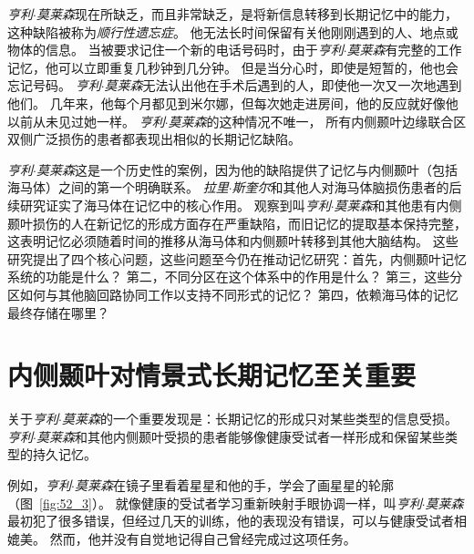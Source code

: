 \textit{亨利$\cdot$莫莱森}现在所缺乏，而且非常缺乏，是将新信息转移到长期记忆中的能力，这种缺陷被称为\textit{顺行性遗忘症}。
他无法长时间保留有关他刚刚遇到的人、地点或物体的信息。
当被要求记住一个新的电话号码时，由于\textit{亨利$\cdot$莫莱森}有完整的工作记忆，他可以立即重复几秒钟到几分钟。
但是当分心时，即使是短暂的，他也会忘记号码。
\textit{亨利$\cdot$莫莱森}无法认出他在手术后遇到的人，即使他一次又一次地遇到他们。
几年来，他每个月都见到米尔娜，但每次她走进房间，他的反应就好像他以前从未见过她一样。
\textit{亨利$\cdot$莫莱森}的这种情况不唯一，
所有内侧颞叶边缘联合区双侧广泛损伤的患者都表现出相似的长期记忆缺陷。


\textit{亨利$\cdot$莫莱森}这是一个历史性的案例，因为他的缺陷提供了记忆与内侧颞叶（包括海马体）之间的第一个明确联系。
\textit{拉里$\cdot$斯奎尔}和其他人对海马体脑损伤患者的后续研究证实了海马体在记忆中的核心作用。
观察到叫\textit{亨利$\cdot$莫莱森}和其他患有内侧颞叶损伤的人在新记忆的形成方面存在严重缺陷，而旧记忆的提取基本保持完整，这表明记忆必须随着时间的推移从海马体和内侧颞叶转移到其他大脑结构。
这些研究提出了四个核心问题，这些问题至今仍在推动记忆研究：首先，内侧颞叶记忆系统的功能是什么？
第二，不同分区在这个体系中的作用是什么？
第三，这些分区如何与其他脑回路协同工作以支持不同形式的记忆？
第四，依赖海马体的记忆最终存储在哪里？



\section{内侧颞叶对情景式长期记忆至关重要}

关于\textit{亨利$\cdot$莫莱森}的一个重要发现是：长期记忆的形成只对某些类型的信息受损。
\textit{亨利$\cdot$莫莱森}和其他内侧颞叶受损的患者能够像健康受试者一样形成和保留某些类型的持久记忆。


例如，\textit{亨利$\cdot$莫莱森}在镜子里看着星星和他的手，学会了画星星的轮廓（图~\ref{fig:52_3}）。
就像健康的受试者学习重新映射手眼协调一样，叫\textit{亨利$\cdot$莫莱森}最初犯了很多错误，但经过几天的训练，他的表现没有错误，可以与健康受试者相媲美。
然而，他并没有自觉地记得自己曾经完成过这项任务。


